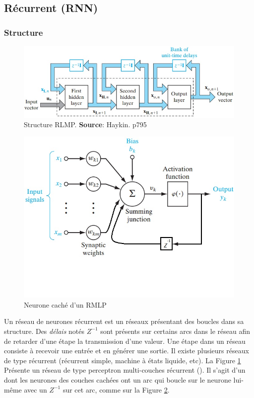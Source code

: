 \subsection{Récurrent (RNN)}
\subsubsection*{Structure}
\begin{figure}
 \centering
 \includegraphics[scale=0.5]{../figures/structurermlp.jpg}
 \caption{Structure RLMP. \textbf{Source}: Haykin. p795\cite{Haykin}}
 \label{structurermlp}
\end{figure}
\begin{figure}
 \centering
 \includegraphics[scale=0.5]{../figures/neuronermlp.jpg}
 \caption{Neurone caché d'un RMLP}
 \label{neuronermlp}
\end{figure}
Un réseau de neurones récurrent est un réseaux présentant des boucles dans sa structure.
Des \emph{délais} notés $Z^{-1}$ sont présents sur certains arcs dans le réseau afin de retarder d'une étape la transmission d'une valeur.
Une étape dans un réseau consiste à recevoir une entrée et en générer une sortie.
Il existe plusieurs réseaux de type récurrent (récurrent simple, machine à états liquide, etc).
La Figure \ref{structurermlp} Présente un réseau de type perceptron multi-couches récurrent (\rmlp).
Il s'agit d'un \mlp dont les neurones des couches cachées ont un arc qui boucle sur le neurone lui-même avec un $Z^{-1}$ sur cet arc, comme sur la Figure \ref{neuronermlp}.
